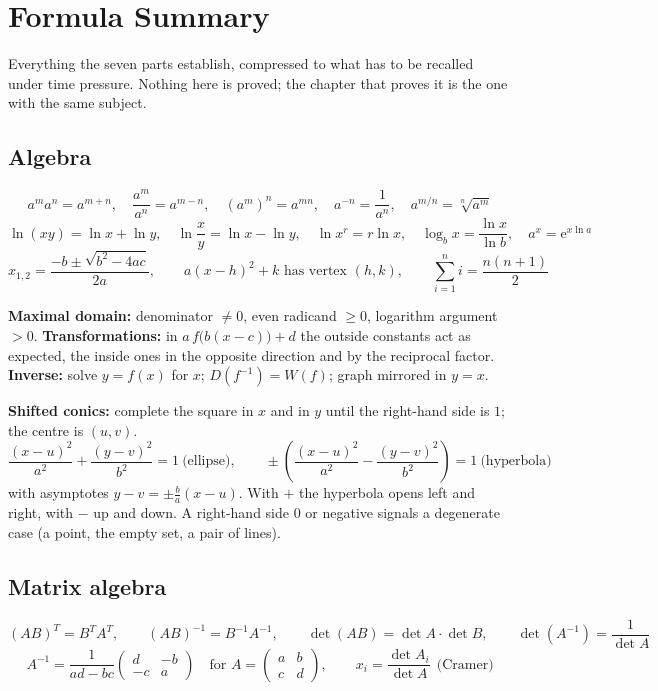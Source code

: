 \chapter*{Formula Summary}

Everything the seven parts establish, compressed to what has to be
recalled under time pressure. Nothing here is proved; the chapter that
proves it is the one with the same subject.

\section*{Algebra}

\[
  a^{m}a^{n}=a^{m+n},\quad
  \frac{a^{m}}{a^{n}}=a^{m-n},\quad
  (a^{m})^{n}=a^{mn},\quad
  a^{-n}=\frac{1}{a^{n}},\quad
  a^{m/n}=\sqrt[n]{a^{m}}
\]
\[
  \ln(xy)=\ln x+\ln y,\quad
  \ln\frac{x}{y}=\ln x-\ln y,\quad
  \ln x^{r}=r\ln x,\quad
  \log_{b}x=\frac{\ln x}{\ln b},\quad
  a^{x}=\mathrm{e}^{x\ln a}
\]
\[
  x_{1,2}=\frac{-b\pm\sqrt{b^{2}-4ac}}{2a},\qquad
  a(x-h)^{2}+k \text{ has vertex } (h,k),\qquad
  \sum_{i=1}^{n}i=\frac{n(n+1)}{2}
\]

\textbf{Maximal domain:} denominator $\neq0$, even radicand $\ge0$,
logarithm argument $>0$. \textbf{Transformations:} in
$a\,f\bigl(b(x-c)\bigr)+d$ the outside constants act as expected, the
inside ones in the opposite direction and by the reciprocal factor.
\textbf{Inverse:} solve $y=f(x)$ for $x$; $D(f^{-1})=W(f)$; graph mirrored
in $y=x$.

\textbf{Shifted conics:} complete the square in $x$ and in $y$ until the
right-hand side is $1$; the centre is $(u,v)$.
\[
  \frac{(x-u)^{2}}{a^{2}}+\frac{(y-v)^{2}}{b^{2}}=1\ \text{(ellipse)},\qquad
  \pm\left(\frac{(x-u)^{2}}{a^{2}}-\frac{(y-v)^{2}}{b^{2}}\right)=1\
  \text{(hyperbola)}
\]
with asymptotes $y-v=\pm\frac{b}{a}(x-u)$.
With $+$ the hyperbola opens left and right, with $-$ up and down. A
right-hand side $0$ or negative signals a degenerate case (a point, the
empty set, a pair of lines).

\section*{Matrix algebra}

\[
  (AB)^{T}=B^{T}A^{T},\qquad (AB)^{-1}=B^{-1}A^{-1},\qquad
  \det(AB)=\det A\cdot\det B,\qquad \det(A^{-1})=\frac{1}{\det A}
\]
\[
  A^{-1}=\frac{1}{ad-bc}\begin{pmatrix} d & -b\\ -c & a\end{pmatrix}
  \quad\text{for } A=\begin{pmatrix} a&b\\c&d\end{pmatrix},
  \qquad
  x_{i}=\frac{\det A_{i}}{\det A}\ \ \text{(Cramer)}
\]

